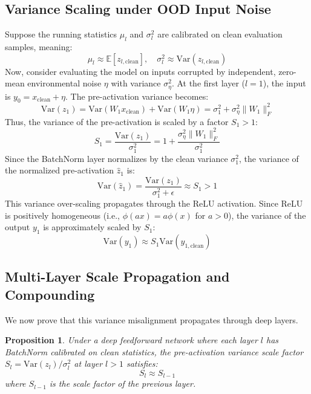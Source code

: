 \documentclass{article}
\theoremstyle{plain}
\newtheorem{proposition}[theorem]{Proposition}
\theoremstyle{definition}
\theoremstyle{remark}
\begin{document}
\subsection{Variance Scaling under OOD Input Noise}
Suppose the running statistics $\mu_l$ and $\sigma^2_l$ are calibrated on clean evaluation samples, meaning:
\begin{equation}
    \mu_l \approx \mathbb{E}[z_{l,\text{clean}}], \quad \sigma^2_l \approx \text{Var}(z_{l,\text{clean}})
\end{equation}
Now, consider evaluating the model on inputs corrupted by independent, zero-mean environmental noise $\eta$ with variance $\sigma^2_\eta$. 
At the first layer ($l=1$), the input is $y_0 = x_{\text{clean}} + \eta$. The pre-activation variance becomes:
\begin{equation}
    \text{Var}(z_1) = \text{Var}(W_1 x_{\text{clean}}) + \text{Var}(W_1 \eta) = \sigma^2_1 + \sigma^2_\eta \|W_1\|_F^2
\end{equation}
Thus, the variance of the pre-activation is scaled by a factor $S_1 > 1$:
\begin{equation}
    S_1 = \frac{\text{Var}(z_1)}{\sigma^2_1} = 1 + \frac{\sigma^2_\eta \|W_1\|_F^2}{\sigma^2_1}
\end{equation}
Since the BatchNorm layer normalizes by the clean variance $\sigma^2_1$, the variance of the normalized pre-activation $\hat{z}_1$ is:
\begin{equation}
    \text{Var}(\hat{z}_1) = \frac{\text{Var}(z_1)}{\sigma^2_1 + \epsilon} \approx S_1 > 1
\end{equation}
This variance over-scaling propagates through the ReLU activation. Since ReLU is positively homogeneous (i.e., $\phi(a x) = a \phi(x)$ for $a > 0$), the variance of the output $y_1$ is approximately scaled by $S_1$:
\begin{equation}
    \text{Var}(y_1) \approx S_1 \text{Var}(y_{1,\text{clean}})
\end{equation}

\subsection{Multi-Layer Scale Propagation and Compounding}
We now prove that this variance misalignment propagates through deep layers.
\begin{proposition}
Under a deep feedforward network where each layer $l$ has BatchNorm calibrated on clean statistics, the pre-activation variance scale factor $S_l = \text{Var}(z_l) / \sigma^2_l$ at layer $l > 1$ satisfies:
\begin{equation}
    S_l \approx S_{l-1}
\end{equation}
where $S_{l-1}$ is the scale factor of the previous layer.
\end{proposition}
\end{document}
